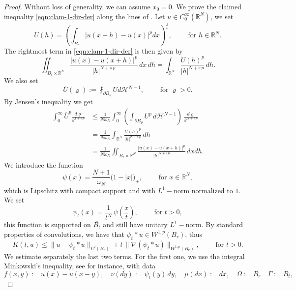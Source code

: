 \documentclass{amsart}
\theoremstyle{definition}
\numberwithin{equation}{section}
\begin{document}
\begin{proof}
	Without loss of generality, we can assume $x_0=0$. We prove the claimed inequality \eqref{eqn:clam-1-dir-der} along the lines of \cite[Proposition 4.5]{BS}. %
	Let $u \in C^\infty_0(\mathbb{R}^N)$, we set 
	\[
	U(h) = \left(\int_{B_{r}}|u(x+h) - u(x)|^p dx\right)^\frac{1}{p}, \qquad \mbox{ for } h \in \mathbb{R}^N.
	\]
	The rightmost term in \eqref{eqn:clam-1-dir-der} is then given by
	\[
	\iint_{B_r \times \mathbb{R}^N} \frac{|u(x) -u(x+h)|^p}{|h|^{N+s\,p}}\,dx\,dh = \int_{\mathbb{R}^N}\frac{U(h)^p}{|h|^{N+s\,p}}\,dh.
	\]
	We also set 
	\[
	\overline{U}(\varrho) := \fint_{\partial B_{\varrho}} Ud\mathcal{H}^{N-1}, \qquad \mbox{ for } \varrho > 0.
	\]
	By Jensen's inequality %
	we get
	\begin{equation} \label{ineq:jensen-dir-der}
		\begin{split}
			\int_{0}^{\infty}\overline{U}^p\frac{d\varrho}{\varrho^{1+s\,p}} &\le \frac{1}{N\omega_N}\int_{0}^{\infty}\left(\int_{\partial B_\varrho} U^p\, d\mathcal{H}^{N-1}\right)\,\frac{d\varrho}{\varrho^{N+s\,p}} \\ 
			&= \frac{1}{N\omega_N} \int_{\mathbb{R}^N}\frac{U(h)^p}{|h|^{N+s\,p}}\,dh \\
			&= \frac{1}{N\omega_N} \iint_{B_r \times \mathbb{R}^N} \frac{|u(x) - u(x+h)|^p}{|h|^{N+s\,p}}\,dxdh.
		\end{split}
	\end{equation}
	We introduce the function \[
	\psi(x) = \frac{N+1}{\omega_N}\big(1-|x|\big)_{+}, \qquad \mbox{ for } x \in \mathbb{R}^N,
	\]
	which is Lipschitz with compact support and with $L^1-$norm normalized to $1$. We set
	\[
	\psi_t(x) = \frac{1}{t^N}\,\psi\left(\frac{x}{t}\right), \qquad \mbox{ for } t > 0,
	\]
	this function is supported on $\overline{B_t}$ and still have unitary $L^1-$norm. By standard properties of convolutions,
	we have that $\psi_t \ast u \in W^{1,p}(B_r)$, thus 
	\[
	K(t,u) \le \|u - \psi_t \ast u\|_{L^p(B_r)} + t\,\|\nabla \left( \psi_t \ast u\right)\|_{W^{1,p}(B_r)}, \qquad \mbox{ for } t > 0.
	\]
	We estimate separately the last two terms. For the first one, we use the integral Minkowski's inequality, see \cite[Theorem 2.4]{LL} for instance, with data
	\[
	f(x,y):= u(x) - u(x-y), \quad \nu(dy):= \psi_t(y)\,dy, \quad \mu(dx):= dx, \quad \Omega:= B_r \quad \Gamma:= B_t,
\]
\end{proof}
\end{document}
